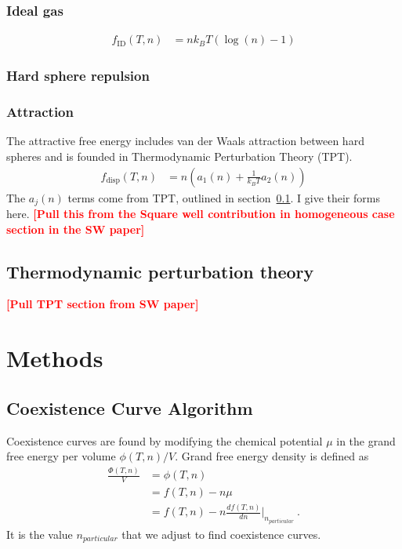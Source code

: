 \documentclass[letterpaper,twocolumn,amsmath,amssymb,prb]{revtex4-1}
\newcommand{\kT}{k_BT}
\newcommand{\npart}{n_{particular}}
\newcommand{\fid}{f_\text{ID}(T,n)}
\newcommand{\fdisp}{f_\text{disp}(T,n)}
\newcommand{\fixme}[1]{\textcolor{red}{\textbf{[#1]}}}
\begin{document}
\subsubsection{Ideal gas}\label{sub2sec:ID}
\begin{align}
  \fid &= n\kT\left(\log(n) - 1\right)
\end{align}

\subsubsection{Hard sphere repulsion}\label{sub2sec:HS}


\subsubsection{Attraction}\label{sub2sec:disp}
The attractive free energy includes van der Waals attraction between hard spheres and is founded in Thermodynamic Perturbation Theory (TPT).
\begin{align}
  \fdisp &= n \left( a_1(n) + \frac{1}{\kT}a_2(n) \right)
\end{align}
The $a_j(n)$ terms come from TPT, outlined in section~\ref{subsec:TPT}. I give their forms here. \fixme{Pull this from the Square well contribution in homogeneous case section in the SW paper}

\subsection{Thermodynamic perturbation theory}\label{subsec:TPT}
\fixme{Pull TPT section from SW paper}

\section{Methods}\label{sec:methods}

\subsection{Coexistence Curve Algorithm}\label{subsec:coexis}
Coexistence curves are found by modifying the chemical potential $\mu$
in the grand free energy per volume $\phi(T,n)/V$. Grand free energy
density is defined as
\begin{align}
  \frac{\Phi(T,n)}{V} &= \phi(T,n) \nonumber \\
                 &= f(T,n) - n\mu \nonumber \\
                 &= f(T,n) - n\frac{df(T,n)}{dn}\bigg|_{\npart}\ .
\end{align}
It is the value $\npart$ that we adjust to find coexistence curves.
\end{document}

